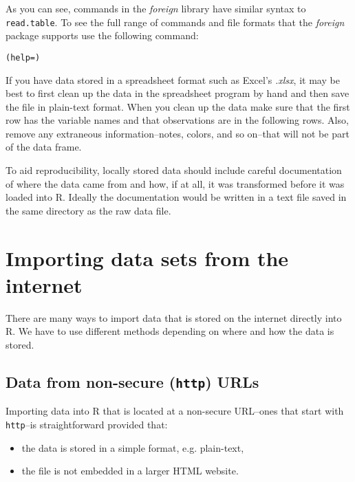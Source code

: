 As you can see, commands in the \emph{foreign} library have similar syntax to \texttt{read.table}. To see the full range of commands and file formats that the \emph{foreign} package supports use the following command:

\begin{knitrout}
\color{fgcolor}\begin{kframe}
\begin{alltt}
(help = )
\end{alltt}
\end{kframe}
\end{knitrout}


If you have data stored in a spreadsheet format such as Excel's \emph{.xlsx}, it may be best to first clean up the data in the spreadsheet program by hand and then save the file in plain-text format. When you clean up the data make sure that the first row has the variable names and that observations are in the following rows. Also, remove any extraneous information--notes, colors, and so on--that will not be part of the data frame.

To aid reproducibility, locally stored data should include careful documentation of where the data came from and how, if at all, it was transformed before it was loaded into R. Ideally the documentation would be written in a text file saved in the same directory as the raw data file. 

\section{Importing data sets from the internet}

There are many ways to import data that is stored on the internet directly into R. We have to use different methods depending on where and how the data is stored. 

\subsection{Data from non-secure ({\tt{http}}) URLs}

Importing data into R that is located at a non-secure URL--ones that start with {\tt{http}}--is straightforward provided that:

\begin{itemize}
	\item the data is stored in a simple format, e.g. plain-text,
	\item the file is not embedded in a larger HTML website.
\end{itemize}

